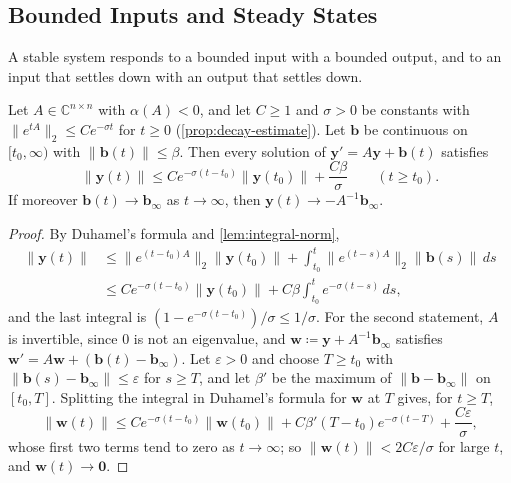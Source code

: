 \subsection{Bounded Inputs and Steady States}

A stable system responds to a bounded input with a bounded output, and to an input that settles down with an output that settles down.

\begin{theorem}
\label{thm:bounded-input}
Let $A\in\mathbb C^{n\times n}$ with $\alpha(A)<0$, and let $C\ge1$ and $\sigma>0$ be constants with $\|e^{tA}\|_2\le Ce^{-\sigma t}$ for $t\ge0$ (\cref{prop:decay-estimate}). Let $\mathbf b$ be continuous on $[t_0,\infty)$ with $\|\mathbf b(t)\|\le\beta$. Then every solution of $\mathbf y'=A\mathbf y+\mathbf b(t)$ satisfies
\[
\|\mathbf y(t)\|\le Ce^{-\sigma(t-t_0)}\|\mathbf y(t_0)\|+\frac{C\beta}\sigma\qquad(t\ge t_0).
\]
If moreover $\mathbf b(t)\to\mathbf b_\infty$ as $t\to\infty$, then $\mathbf y(t)\to-A^{-1}\mathbf b_\infty$.
\end{theorem}

\begin{proof}
By Duhamel's formula and \cref{lem:integral-norm},
\[
\begin{aligned}
\|\mathbf y(t)\|&\le\|e^{(t-t_0)A}\|_2\|\mathbf y(t_0)\|+\int_{t_0}^t\|e^{(t-s)A}\|_2\|\mathbf b(s)\|\,ds\\
&\le Ce^{-\sigma(t-t_0)}\|\mathbf y(t_0)\|+C\beta\int_{t_0}^te^{-\sigma(t-s)}\,ds ,
\end{aligned}
\]
and the last integral is $(1-e^{-\sigma(t-t_0)})/\sigma\le1/\sigma$. For the second statement, $A$ is invertible, since $0$ is not an eigenvalue, and $\mathbf w\coloneqq\mathbf y+A^{-1}\mathbf b_\infty$ satisfies $\mathbf w'=A\mathbf w+(\mathbf b(t)-\mathbf b_\infty)$. Let $\varepsilon>0$ and choose $T\ge t_0$ with $\|\mathbf b(s)-\mathbf b_\infty\|\le\varepsilon$ for $s\ge T$, and let $\beta'$ be the maximum of $\|\mathbf b-\mathbf b_\infty\|$ on $[t_0,T]$. Splitting the integral in Duhamel's formula for $\mathbf w$ at $T$ gives, for $t\ge T$,
\[
\|\mathbf w(t)\|\le Ce^{-\sigma(t-t_0)}\|\mathbf w(t_0)\|+C\beta'(T-t_0)e^{-\sigma(t-T)}+\frac{C\varepsilon}\sigma ,
\]
whose first two terms tend to zero as $t\to\infty$; so $\|\mathbf w(t)\|<2C\varepsilon/\sigma$ for large $t$, and $\mathbf w(t)\to\mathbf 0$.
\end{proof}

